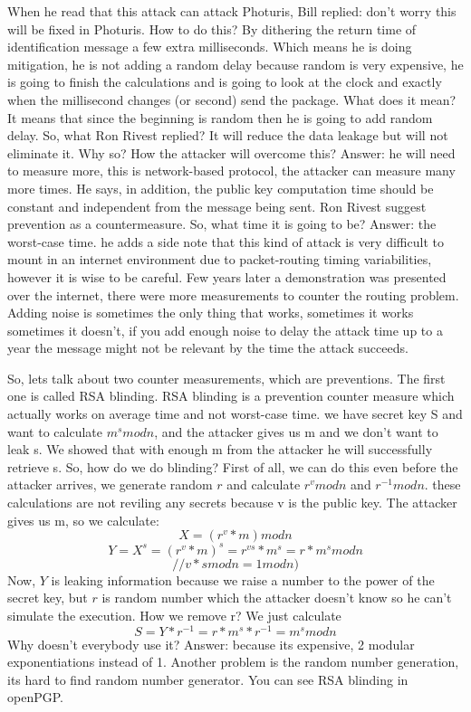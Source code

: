 When he read that this attack can attack Photuris, Bill replied: don’t worry this will be fixed in Photuris. How to do this? By dithering the return time of identification message a few extra milliseconds. Which means he is doing mitigation, he is not adding a random delay because random is very expensive, he is going to finish the calculations and is going to look at the clock and exactly when the millisecond changes (or second) send the package. What does it mean? It means that since the beginning is random then he is going to add random delay. So, what Ron Rivest replied? It will reduce the data leakage but will not eliminate it. Why so? How the attacker will overcome this? Answer: he will need to measure more, this is network-based protocol, the attacker can measure many more times. He says, in addition, the public key computation time should be constant and independent from the message being sent. Ron Rivest suggest prevention as a countermeasure. So, what time it is going to be? Answer: the worst-case time. he adds a side note that this kind of attack is very difficult to mount in an internet environment due to packet-routing timing variabilities, however it is wise to be careful. Few years later a demonstration was presented over the internet, there were more measurements to counter the routing problem. Adding noise is sometimes the only thing that works, sometimes it works sometimes it doesn’t, if you add enough noise to delay the attack time up to a year the message might not be relevant by the time the attack succeeds.

So, lets talk about two counter measurements, which are preventions. The first one is called RSA blinding. RSA blinding is a prevention counter measure which actually works on average time and not worst-case time. we have secret key S and want to calculate \(m^s mod n\), and the attacker gives us m and we don’t want to leak s. We showed that with enough m from the attacker he will successfully retrieve s. 
So, how do we do blinding? First of all, we can do this even before the attacker arrives, we generate random $r$ and calculate \(r^v mod n\) and \(r^{-1} mod n\). these calculations are not reviling any secrets because v is the public key. The attacker gives us m, so we calculate: 
\[X = (r^v * m) mod n\]
\[Y = X^s = (r^v*m)^s = r^{vs}*m^s = r*m^s mod n \] 
\[ // v*s mod n = 1 mod n)\]
Now, $Y$ is leaking information because we raise a number to the power of the secret key, but $r$ is random number which the attacker doesn’t know so he can’t simulate the execution. How we remove r? We just calculate 
\[S = Y*r^{-1} = r*m^s*r^{-1} = m^s mod n\]
Why doesn’t everybody use it? Answer: because its expensive, 2 modular exponentiations instead of 1. Another problem is the random number generation, its hard to find random number generator. You can see RSA blinding in openPGP. 

